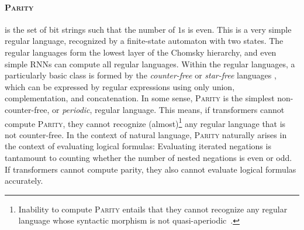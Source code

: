 \documentclass[11pt,a4paper]{article}
\begin{document}
\paragraph{\textsc{Parity}} is the set of bit strings such that the number of $1$s is even.
This is a very simple regular language, recognized by a finite-state automaton with two states.
The regular languages form the lowest layer of the Chomsky hierarchy, and even simple RNNs can compute all regular languages.
Within the regular languages, a particularly basic class is formed by the \emph{counter-free} or \emph{star-free} languages \cite{mcnaughton1971counter}, which can be expressed by regular expressions using only union, complementation, and concatenation.
In some sense, \textsc{Parity} is the simplest non-counter-free, or \emph{periodic}, regular language.
This means, if transformers cannot compute \textsc{Parity}, they cannot recognize (almost)\footnote{Inability to compute \textsc{Parity} entails that they cannot recognize any regular language whose syntactic morphism is not quasi-aperiodic~\cite[p. 488]{barrington1992regular}.} any regular language that is not counter-free.
In the context of natural language, \textsc{Parity} naturally arises in the context of evaluating logical formulas:
Evaluating iterated negations is tantamount to counting whether the number of nested negations is even or odd.
If transformers cannot compute parity, they also cannot evaluate logical formulas accurately.





\end{document}
